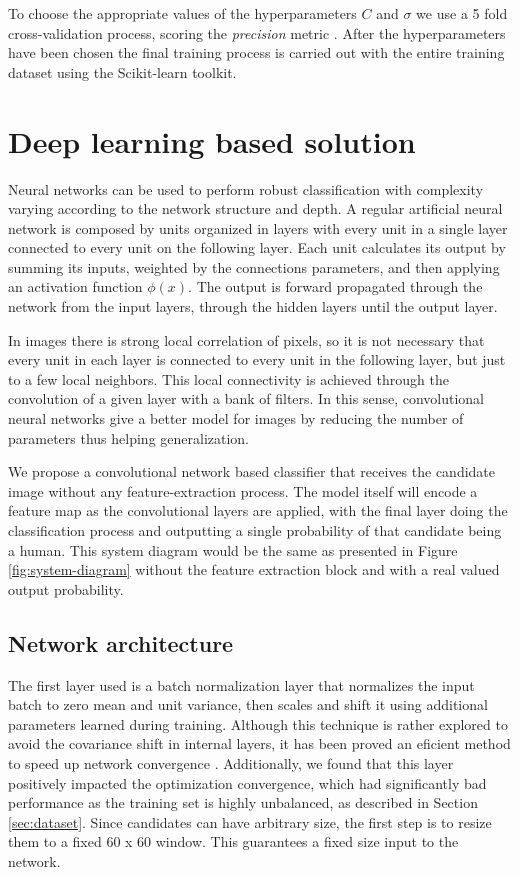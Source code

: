       To choose the appropriate values of the hyperparameters $C$ and $\sigma$ we use a 5 fold cross-validation process, scoring the \textit{precision} metric \cite{evaluationMetrics}. After the hyperparameters have been chosen the final training process is carried out with the entire training dataset using the Scikit-learn \cite{scikit-learn} toolkit.


\section{Deep learning based solution}
\label{sec:deep}

    Neural networks can be used to perform robust classification with complexity varying according to the network structure and depth. A regular artificial neural network is composed by units organized in layers with every unit in a single layer connected to every unit on the following layer. Each unit calculates its output by summing its inputs, weighted by the connections parameters, and then applying an activation function $\phi(x)$. The output is forward propagated through the network from the input layers, through the hidden layers until the output layer.

    In images there is strong local correlation of pixels, so it is not necessary that every unit in each layer is connected to every unit in the following layer, but just to a few local neighbors. This local connectivity is achieved through the convolution of a given layer with a bank of filters. In this sense, convolutional neural networks give a better model for images by reducing the number of parameters thus helping generalization.

    We propose a convolutional network based classifier that receives the candidate image without any feature-extraction process. The model itself will encode a feature map as the convolutional layers are applied, with the final layer doing the classification process and outputting a single probability of that candidate being a human. This system diagram would be the same as presented in Figure \ref{fig:system-diagram} without the feature extraction block and with a real valued output probability.

    \subsection{Network architecture}
        The first layer used is a batch normalization layer \cite{DBLP:journals/corr/IoffeS15} that normalizes the input batch to zero mean and unit variance, then scales and shift it using additional parameters learned during training. Although this technique is rather explored to avoid the covariance shift in internal layers, it has been proved an eficient method to speed up network convergence \cite{DBLP:journals/corr/IoffeS15}. Additionally, we found that this layer positively impacted the optimization convergence, which had significantly bad performance as the training set is highly unbalanced, as described in Section \ref{sec:dataset}. Since candidates can have arbitrary size, the first step is to resize them to a fixed 60 x 60 window. This guarantees a fixed size input to the network.

